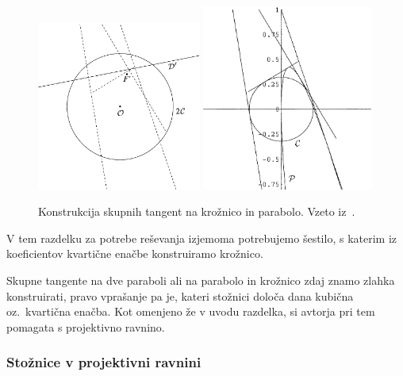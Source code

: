 \begin{figure}[h]
    \centering
    \includegraphics[width=0.48\textwidth]{images/tang_krozn_par1.png}
    \includegraphics[width=0.5\textwidth]{images/tang_krozn_par2.png}
    \caption[Skupna tangenta na krožnico in parabolo]{Konstrukcija skupnih tangent na krožnico in parabolo. Vzeto iz~\cite[str.\ 24--25]{edwards2001}.}
    \label{fig:tang_kroznica_par}
\end{figure}

\begin{opomba}
    V tem razdelku za potrebe reševanja izjemoma potrebujemo šestilo, s katerim iz koeficientov kvartične enačbe konstruiramo krožnico.
\end{opomba}

Skupne tangente na dve paraboli ali na parabolo in krožnico zdaj znamo zlahka konstruirati, pravo vprašanje pa je, kateri stožnici določa dana kubična oz.\ kvartična enačba. Kot omenjeno že v uvodu razdelka, si avtorja pri tem pomagata s projektivno ravnino. 

\subsubsection*{Stožnice v projektivni ravnini}

